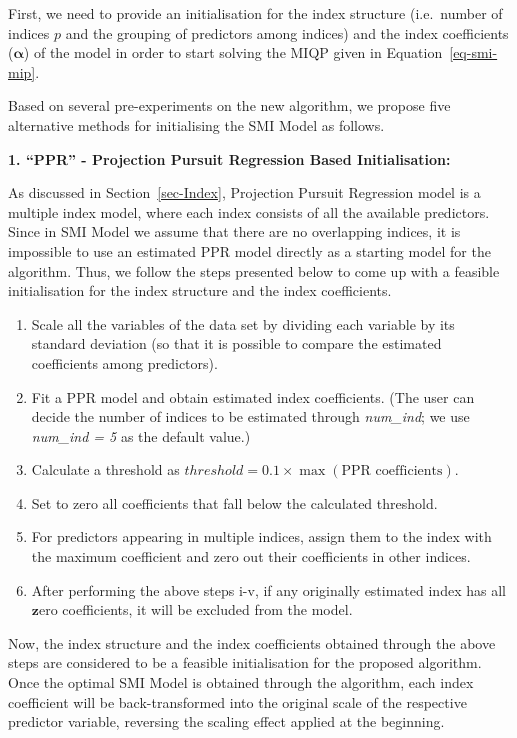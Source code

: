 \documentclass[11pt,a4paper,]{article}
\begin{document}
First, we need to provide an initialisation for the index structure
(i.e.~number of indices \(p\) and the grouping of predictors among
indices) and the index coefficients (\(\bm{\alpha}\)) of the model in
order to start solving the MIQP given in Equation~\ref{eq-smi-mip}.

Based on several pre-experiments on the new algorithm, we propose five
alternative methods for initialising the SMI Model as follows.

\textbf{1. ``PPR'' - Projection Pursuit Regression Based
Initialisation:}

As discussed in Section~\ref{sec-Index}, Projection Pursuit Regression
model is a multiple index model, where each index consists of all the
available predictors. Since in SMI Model we assume that there are no
overlapping indices, it is impossible to use an estimated PPR model
directly as a starting model for the algorithm. Thus, we follow the
steps presented below to come up with a feasible initialisation for the
index structure and the index coefficients.

\begin{enumerate}
\def\labelenumi{\roman{enumi}.}
\item
  Scale all the variables of the data set by dividing each variable by
  its standard deviation (so that it is possible to compare the
  estimated coefficients among predictors).
\item
  Fit a PPR model and obtain estimated index coefficients. (The user can
  decide the number of indices to be estimated through \emph{num\_ind};
  we use \emph{num\_ind = 5} as the default value.)
\item
  Calculate a threshold as
  \(threshold = 0.1 \times \max(\text{PPR coefficients})\).
\item
  Set to zero all coefficients that fall below the calculated threshold.
\item
  For predictors appearing in multiple indices, assign them to the index
  with the maximum coefficient and zero out their coefficients in other
  indices.
\item
  After performing the above steps i-v, if any originally estimated
  index has all \(\bm{z}\)ero coefficients, it will be excluded from the
  model.
\end{enumerate}

Now, the index structure and the index coefficients obtained through the
above steps are considered to be a feasible initialisation for the
proposed algorithm. Once the optimal SMI Model is obtained through the
algorithm, each index coefficient will be back-transformed into the
original scale of the respective predictor variable, reversing the
scaling effect applied at the beginning.
\end{document}
